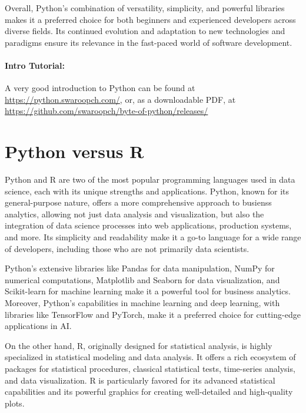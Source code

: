 Overall, Python's combination of versatility, simplicity, and powerful libraries makes it a preferred choice for both beginners and experienced developers across diverse fields. Its continued evolution and adaptation to new technologies and paradigms ensure its relevance in the fast-paced world of software development.

\begin{tcolorbox}[colback=code]
\paragraph*{Intro Tutorial:} 

A very good introduction to Python can be found at \url{https://python.swaroopch.com/}, or, as a downloadable PDF, at \url{https://github.com/swaroopch/byte-of-python/releases/}
\end{tcolorbox}

\section{Python versus R}

Python and R are two of the most popular programming languages used in data science, each with its unique strengths and applications. Python, known for its general-purpose nature, offers a more comprehensive approach to busienss analytics, allowing not just data analysis and visualization, but also the integration of data science processes into web applications, production systems, and more. Its simplicity and readability make it a go-to language for a wide range of developers, including those who are not primarily data scientists.

Python's extensive libraries like Pandas for data manipulation, NumPy for numerical computations, Matplotlib and Seaborn for data visualization, and Scikit-learn for machine learning make it a powerful tool for business analytics. Moreover, Python's capabilities in machine learning and deep learning, with libraries like TensorFlow and PyTorch, make it a preferred choice for cutting-edge applications in AI.

On the other hand, R, originally designed for statistical analysis, is highly specialized in statistical modeling and data analysis. It offers a rich ecosystem of packages for statistical procedures, classical statistical tests, time-series analysis, and data visualization. R is particularly favored for its advanced statistical capabilities and its powerful graphics for creating well-detailed and high-quality plots.

